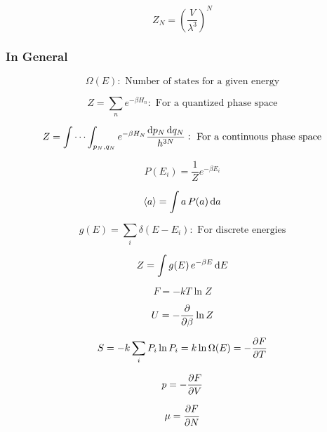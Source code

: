 \documentclass{article}
\begin{document}
\begin{equation}
	Z_N=\left(\frac{V}{\lambda^3}\right)^N
\end{equation}
\subsubsection{In General}
\begin{equation}
	\Omega(E): \text{   Number of states for a given energy}
\end{equation}

\begin{equation}
	Z=\sum_n e^{-\beta H_n}: \text{   For a quantized phase space}
\end{equation}

\begin{equation}
	Z=\idotsint_{p_N, q_N} e^{-\beta H_N} \frac{\dif p_N \dif q_N}{h^{3N}}: \text{   For a continuous phase space}
\end{equation}

\begin{equation}
	P(E_i)=\frac{1}{Z}e^{-\beta E_i}
\end{equation}

\begin{equation}
	\left\langle a \right\rangle=\int a \, P(a) \dif a
\end{equation}

\begin{equation}
	g(E)=\sum_i \delta(E-E_i): \text{   For discrete energies}
\end{equation}

\begin{equation}
	Z=\int g(E) \, e^{-\beta E}\dif E
\end{equation}

\begin{equation}
	F=-kT\ln Z
\end{equation}

\begin{equation}
	U=-\pdv{\beta}\ln Z
\end{equation}

\begin{equation}
	S=-k\sum_i P_i \ln P_i=k\ln\Omega(E)=-\pdv{F}{T}
\end{equation}

\begin{equation}
	p=-\pdv{F}{V}
\end{equation}

\begin{equation}
	\mu=\pdv{F}{N}
\end{equation}
\end{document}
